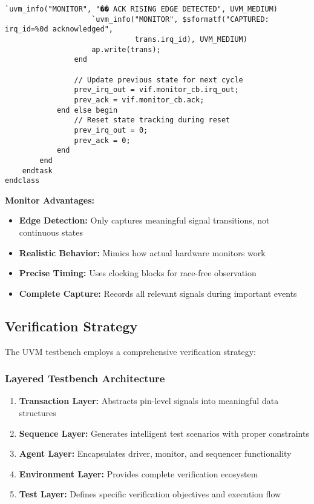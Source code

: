 \documentclass[12pt,a4paper]{article}
\begin{document}
\begin{lstlisting}[caption=Edge-Based Monitor Implementation, label=lst:monitor]
                    `uvm_info("MONITOR", "�� ACK RISING EDGE DETECTED", UVM_MEDIUM)
                    `uvm_info("MONITOR", $sformatf("CAPTURED: irq_id=%0d acknowledged", 
                              trans.irq_id), UVM_MEDIUM)
                    ap.write(trans);
                end
                
                // Update previous state for next cycle
                prev_irq_out = vif.monitor_cb.irq_out;
                prev_ack = vif.monitor_cb.ack;
            end else begin
                // Reset state tracking during reset
                prev_irq_out = 0;
                prev_ack = 0;
            end
        end
    endtask
endclass
\end{lstlisting}

\textbf{Monitor Advantages:}
\begin{itemize}
    \item \textbf{Edge Detection:} Only captures meaningful signal transitions, not continuous states
    \item \textbf{Realistic Behavior:} Mimics how actual hardware monitors work
    \item \textbf{Precise Timing:} Uses clocking blocks for race-free observation
    \item \textbf{Complete Capture:} Records all relevant signals during important events
\end{itemize}


\subsection{Verification Strategy}
The UVM testbench employs a comprehensive verification strategy:

\subsubsection{Layered Testbench Architecture}
\begin{enumerate}
    \item \textbf{Transaction Layer:} Abstracts pin-level signals into meaningful data structures
    \item \textbf{Sequence Layer:} Generates intelligent test scenarios with proper constraints
    \item \textbf{Agent Layer:} Encapsulates driver, monitor, and sequencer functionality
    \item \textbf{Environment Layer:} Provides complete verification ecosystem
    \item \textbf{Test Layer:} Defines specific verification objectives and execution flow
\end{enumerate}
\end{document}
